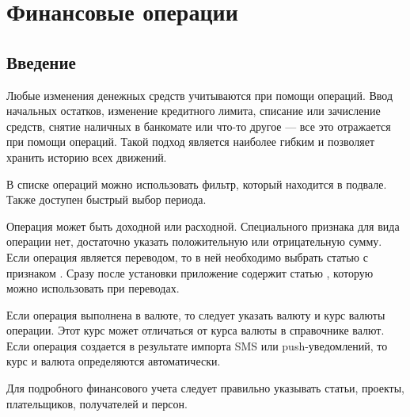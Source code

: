 \documentclass[a4paper,10pt,russian]{sphinxmanual}
\begin{document}
\chapter{Финансовые операции}
\label{\detokenize{transactions:chapter-transactions}}\label{\detokenize{transactions:id1}}\label{\detokenize{transactions::doc}}

\section{Введение}
\label{\detokenize{transactions:id2}}
Любые изменения денежных средств учитываются при помощи операций. Ввод начальных остатков,
изменение кредитного лимита, списание или зачисление средств, снятие наличных в банкомате или
что-то другое — все это отражается при помощи операций. Такой
подход является наиболее гибким и позволяет хранить историю всех движений.

\noindent{}
\noindent{}
\noindent{}

В списке операций можно использовать фильтр, который находится в подвале. Также доступен быстрый выбор периода.

\noindent{}
\noindent{}
\noindent{}

Операция может быть доходной или расходной. Специального признака для вида операции нет, достаточно указать
положительную или отрицательную сумму. Если операция является переводом, то в ней необходимо выбрать статью
с признаком . Сразу после установки приложение содержит статью ,
которую можно использовать при переводах.

Если операция выполнена в валюте, то следует указать валюту и курс валюты операции. Этот курс может отличаться
от курса валюты в справочнике валют. Если операция создается в результате импорта SMS или push-уведомлений, то
курс и валюта определяются автоматически.

Для подробного финансового учета следует правильно указывать статьи, проекты, плательщиков, получателей и персон.
\end{document}
